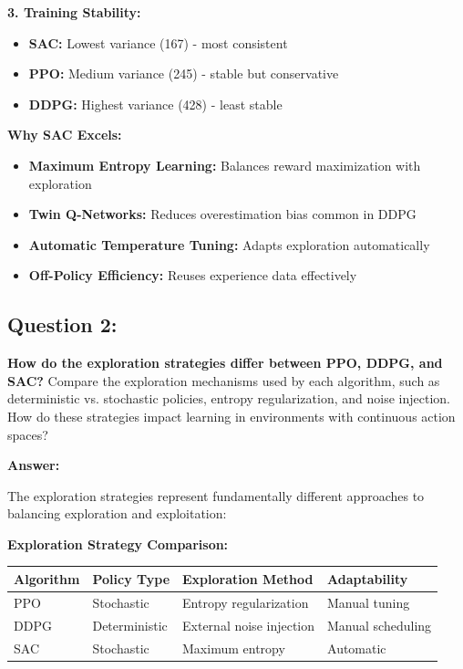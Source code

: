 \documentclass[12pt]{article}
\begin{document}
{{{\textbf{3. Training Stability:}
\begin{itemize}
    \item \textbf{SAC:} Lowest variance (167) - most consistent
    \item \textbf{PPO:} Medium variance (245) - stable but conservative
    \item \textbf{DDPG:} Highest variance (428) - least stable
\end{itemize}

\textbf{Why SAC Excels:}
\begin{itemize}
    \item \textbf{Maximum Entropy Learning:} Balances reward maximization with exploration
    \item \textbf{Twin Q-Networks:} Reduces overestimation bias common in DDPG
    \item \textbf{Automatic Temperature Tuning:} Adapts exploration automatically
    \item \textbf{Off-Policy Efficiency:} Reuses experience data effectively
\end{itemize}

\subsection{Question 2:}
\textbf{How do the exploration strategies differ between PPO, DDPG, and SAC?}
\newline
Compare the exploration mechanisms used by each algorithm, such as deterministic vs. stochastic policies, entropy regularization, and noise injection. How do these strategies impact learning in environments with continuous action spaces?

\textbf{Answer:}

The exploration strategies represent fundamentally different approaches to balancing exploration and exploitation:

\textbf{Exploration Strategy Comparison:}

\begin{table}[h]
\centering
\begin{tabular}{|l|l|l|l|}
\hline
\textbf{Algorithm} & \textbf{Policy Type} & \textbf{Exploration Method} & \textbf{Adaptability} \\
\hline
PPO & Stochastic & Entropy regularization & Manual tuning \\
DDPG & Deterministic & External noise injection & Manual scheduling \\
SAC & Stochastic & Maximum entropy & Automatic \\
\hline
\end{tabular}
\end{table}

}}}
\end{document}
